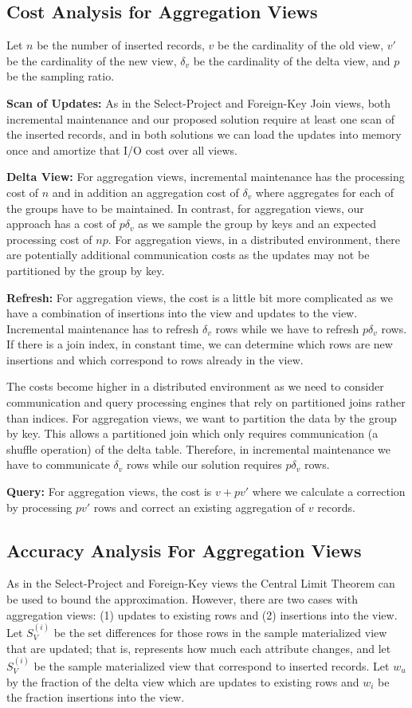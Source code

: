 \subsection{Cost Analysis for Aggregation Views}
Let $n$ be the number of inserted records, $v$ be the cardinality of the old view, $v'$ be the cardinality of the new view, $\delta_v$ be the cardinality of the delta view, and $p$ be the sampling ratio.  

\textbf{Scan of Updates: }
As in the Select-Project and Foreign-Key Join views, both incremental maintenance and our proposed solution require at least one scan of the inserted records, and in both solutions we can load the updates into memory once and amortize that I/O cost over all views. 

\textbf{Delta View: }  For aggregation views, incremental maintenance has the processing cost of $n$ and in addition an aggregation cost of $\delta_v$ where aggregates for each of the groups have to be maintained. In contrast, for aggregation views, our approach has a cost of $p\delta_v$ as we sample the group by keys and an expected processing cost of $np$. 
For aggregation views, in a distributed environment, there are potentially additional communication costs as the updates may not be partitioned by the group by key.

\textbf{Refresh: } For aggregation views, the cost is a little bit more complicated as we have a combination of insertions into the view and updates to the view. 
Incremental maintenance has to refresh $\delta_v$ rows while we have to refresh $p\delta_v$ rows. 
If there is a join index, in constant time, we can determine which rows are new insertions and which correspond to rows already in the view.

The costs become higher in a distributed environment as we need to consider communication and query processing engines that rely on partitioned joins rather than indices.
For aggregation views, we want to partition the data by the group by key.
This allows a partitioned join which only requires communication (a shuffle operation) of the delta table.
Therefore, in incremental maintenance we have to communicate $\delta_v$ rows while our solution requires $p\delta_v$ rows.

\textbf{Query: } For aggregation views, the cost is $v + pv'$ where we calculate a correction by processing $pv'$ rows and correct an existing aggregation of $v$ records.

\subsection{Accuracy Analysis For Aggregation Views}
As in the Select-Project and Foreign-Key views the Central Limit Theorem can
be used to bound the approximation.
However, there are two cases with aggregation views: (1) updates to existing rows and (2) insertions into the view.
Let $S_{V}^{(i)}$ be the set differences for those rows in the sample materialized view that are updated; that is, represents how much each attribute 
changes, and let $S_{V}^{(i)}$ be the sample materialized view that correspond to inserted records.
Let $w_u$ by the fraction of the delta view which are updates to existing rows and $w_i$ be the fraction insertions into the view.

